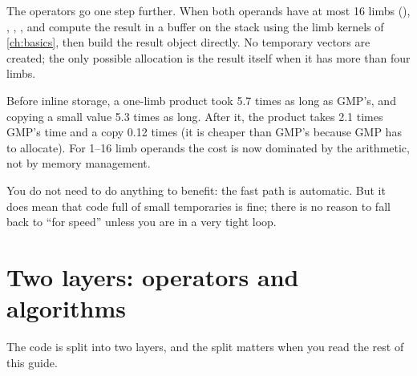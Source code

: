 The operators go one step further. When both operands have at most 16 limbs
(), \code{+}, \code{-}, \code{*}, \code{/}
and \code{\%} compute the result in a buffer on the stack using the limb kernels of
\cref{ch:basics}, then build the result object directly. No temporary vectors are
created; the only possible allocation is the result itself when it has more than four
limbs.

\begin{perfnote}
Before inline storage, a one-limb product took 5.7 times as long as GMP's, and copying
a small value 5.3 times as long. After it, the product takes 2.1 times GMP's time and a
copy 0.12 times (it is cheaper than GMP's because GMP has to allocate). For 1--16 limb
operands the cost is now dominated by the arithmetic, not by memory management.
\end{perfnote}

\begin{practice}
You do not need to do anything to benefit: the fast path is automatic. But it does
mean that code full of small  temporaries is fine; there is no reason
to fall back to  ``for speed'' unless you are in a very tight loop.
\end{practice}

\section{Two layers: operators and algorithms}

The code is split into two layers, and the split matters when you read the rest of
this guide.

